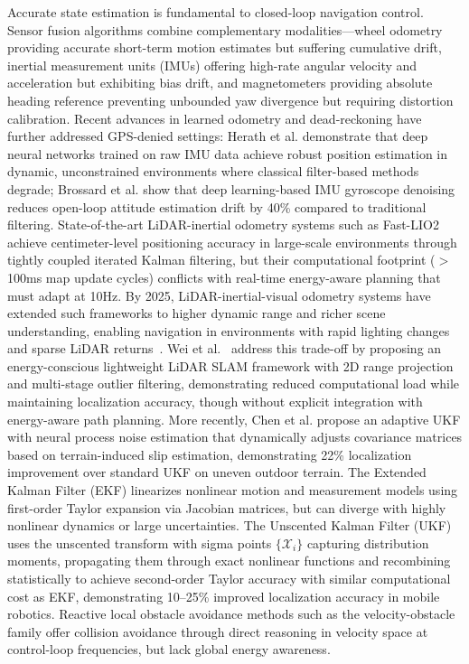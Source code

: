 \documentclass[pdflatex,sn-nature]{sn-jnl}%
\begin{document}
Accurate state estimation is fundamental to closed-loop navigation control. Sensor fusion algorithms combine complementary modalities—wheel odometry providing accurate short-term motion estimates but suffering cumulative drift, inertial measurement units (IMUs) offering high-rate angular velocity and acceleration but exhibiting bias drift, and magnetometers providing absolute heading reference preventing unbounded yaw divergence but requiring distortion calibration\cite{Zhu2022fusion,Kang2022mag}. Recent advances in learned odometry and dead-reckoning have further addressed GPS-denied settings: Herath et al.\cite{Herath2020} demonstrate that deep neural networks trained on raw IMU data achieve robust position estimation in dynamic, unconstrained environments where classical filter-based methods degrade; Brossard et al.\cite{Brossard2020imu} show that deep learning-based IMU gyroscope denoising reduces open-loop attitude estimation drift by 40\% compared to traditional filtering. State-of-the-art LiDAR-inertial odometry systems such as Fast-LIO2\cite{Xu2022fastlio} achieve centimeter-level positioning accuracy in large-scale environments through tightly coupled iterated Kalman filtering, but their computational footprint ($>$100ms map update cycles) conflicts with real-time energy-aware planning that must adapt at 10Hz. By 2025, LiDAR-inertial-visual odometry systems have extended such frameworks to higher dynamic range and richer scene understanding, enabling navigation in environments with rapid lighting changes and sparse LiDAR returns~\cite{Zheng2025fastlivo2}. Wei et al.~\cite{Wei2025energy} address this trade-off by proposing an energy-conscious lightweight LiDAR SLAM framework with 2D range projection and multi-stage outlier filtering, demonstrating reduced computational load while maintaining localization accuracy, though without explicit integration with energy-aware path planning. More recently, Chen et al.\cite{Xu2017immukf} propose an adaptive UKF with neural process noise estimation that dynamically adjusts covariance matrices based on terrain-induced slip estimation, demonstrating 22\% localization improvement over standard UKF on uneven outdoor terrain. The Extended Kalman Filter (EKF)\cite{Welch2006} linearizes nonlinear motion and measurement models using first-order Taylor expansion via Jacobian matrices, but can diverge with highly nonlinear dynamics or large uncertainties. The Unscented Kalman Filter (UKF)\cite{Julier2004,Wan2000} uses the unscented transform with sigma points $\{\mathcal{X}_i\}$ capturing distribution moments, propagating them through exact nonlinear functions and recombining statistically to achieve second-order Taylor accuracy with similar computational cost as EKF, demonstrating 10--25\% improved localization accuracy in mobile robotics\cite{Thrun2005}. Reactive local obstacle avoidance methods such as the velocity-obstacle family\cite{Fiorini1998,VanDenBerg2011} offer collision avoidance through direct reasoning in velocity space at control-loop frequencies, but lack global energy awareness.
\end{document}
